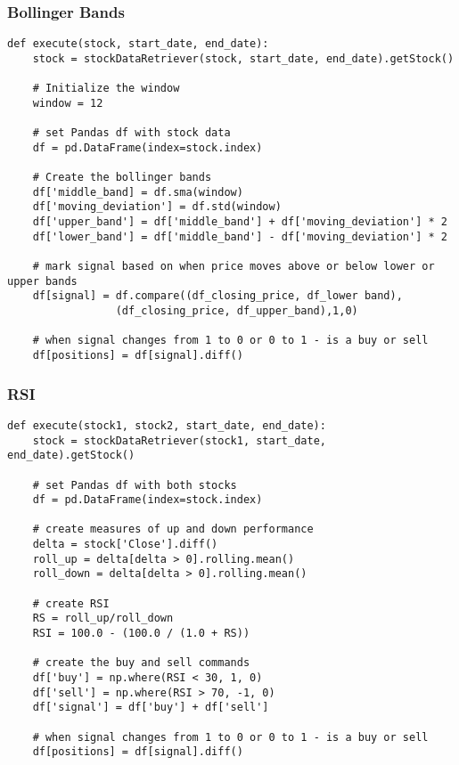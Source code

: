 \documentclass[../thesis.tex]{subfiles}
\begin{document}
\subsubsection{Bollinger Bands }

\begin{verbatim}
def execute(stock, start_date, end_date):
    stock = stockDataRetriever(stock, start_date, end_date).getStock()

    # Initialize the window
    window = 12

    # set Pandas df with stock data
    df = pd.DataFrame(index=stock.index)

    # Create the bollinger bands
    df['middle_band] = df.sma(window)
    df['moving_deviation'] = df.std(window)
    df['upper_band'] = df['middle_band'] + df['moving_deviation'] * 2
    df['lower_band'] = df['middle_band'] - df['moving_deviation'] * 2

    # mark signal based on when price moves above or below lower or upper bands
    df[signal] = df.compare((df_closing_price, df_lower band), 
    		     (df_closing_price, df_upper_band),1,0)

    # when signal changes from 1 to 0 or 0 to 1 - is a buy or sell
    df[positions] = df[signal].diff()

\end{verbatim}

\subsubsection{RSI }

\begin{verbatim}
def execute(stock1, stock2, start_date, end_date):
    stock = stockDataRetriever(stock1, start_date, end_date).getStock()

    # set Pandas df with both stocks
    df = pd.DataFrame(index=stock.index)

    # create measures of up and down performance
    delta = stock['Close'].diff()
    roll_up = delta[delta > 0].rolling.mean()
    roll_down = delta[delta > 0].rolling.mean()
    
    # create RSI
    RS = roll_up/roll_down
    RSI = 100.0 - (100.0 / (1.0 + RS))

    # create the buy and sell commands
    df['buy'] = np.where(RSI < 30, 1, 0)
    df['sell'] = np.where(RSI > 70, -1, 0)
    df['signal'] = df['buy'] + df['sell']

    # when signal changes from 1 to 0 or 0 to 1 - is a buy or sell
    df[positions] = df[signal].diff()

\end{verbatim}
\end{document}
